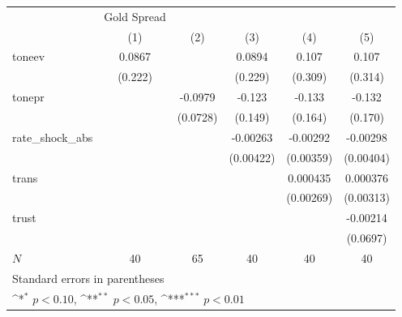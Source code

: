 {
\def\sym#1{\ifmmode^{#1}\else\(^{#1}\)\fi}
\begin{tabular}{l*{5}{c}}
\hline\hline
            & Gold Spread         &                     &                     &                     &                     \\
            &\multicolumn{1}{c}{(1)}         &\multicolumn{1}{c}{(2)}         &\multicolumn{1}{c}{(3)}         &\multicolumn{1}{c}{(4)}         &\multicolumn{1}{c}{(5)}         \\
\hline
toneev      &      0.0867         &                     &      0.0894         &       0.107         &       0.107         \\
            &     (0.222)         &                     &     (0.229)         &     (0.309)         &     (0.314)         \\
[1em]
tonepr      &                     &     -0.0979         &      -0.123         &      -0.133         &      -0.132         \\
            &                     &    (0.0728)         &     (0.149)         &     (0.164)         &     (0.170)         \\
[1em]
rate\_shock\_abs&                     &                     &    -0.00263         &    -0.00292         &    -0.00298         \\
            &                     &                     &   (0.00422)         &   (0.00359)         &   (0.00404)         \\
[1em]
trans       &                     &                     &                     &    0.000435         &    0.000376         \\
            &                     &                     &                     &   (0.00269)         &   (0.00313)         \\
[1em]
trust       &                     &                     &                     &                     &    -0.00214         \\
            &                     &                     &                     &                     &    (0.0697)         \\
\hline
\(N\)       &          40         &          65         &          40         &          40         &          40         \\
\hline\hline
\multicolumn{6}{l}{\footnotesize Standard errors in parentheses}\\
\multicolumn{6}{l}{\footnotesize \sym{*} \(p<0.10\), \sym{**} \(p<0.05\), \sym{***} \(p<0.01\)}\\
\end{tabular}
}
